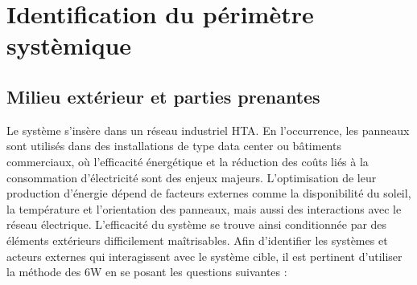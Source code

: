 \documentclass{article}
\begin{document}
\section{Identification du périmètre systèmique}


\subsection{Milieu extérieur et parties prenantes}
Le système s'insère dans un réseau industriel HTA. En l'occurrence, les panneaux sont utilisés dans des installations de type data center ou bâtiments commerciaux, où l'efficacité énergétique et la réduction des coûts liés à la consommation d'électricité sont des enjeux majeurs. L’optimisation de leur production d’énergie dépend de facteurs externes comme la disponibilité du soleil, la température et l'orientation des panneaux, mais aussi des interactions avec le réseau électrique. L’efficacité du système se trouve ainsi conditionnée par des éléments extérieurs difficilement maîtrisables. 
Afin d'identifier les systèmes et acteurs externes qui interagissent avec le système cible, il est pertinent d'utiliser la méthode des 6W en se posant les questions suivantes :
\end{document}
